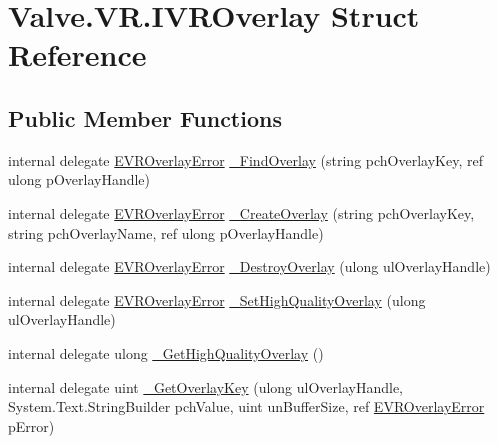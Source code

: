 \hypertarget{struct_valve_1_1_v_r_1_1_i_v_r_overlay}{}\section{Valve.\+V\+R.\+I\+V\+R\+Overlay Struct Reference}
\label{struct_valve_1_1_v_r_1_1_i_v_r_overlay}
\subsection*{Public Member Functions}
\begin{DoxyCompactItemize}
\item 
internal delegate \mbox{\hyperlink{namespace_valve_1_1_v_r_aaee5c5144f42b7969d45b854f51b0c18}{E\+V\+R\+Overlay\+Error}} \mbox{\hyperlink{struct_valve_1_1_v_r_1_1_i_v_r_overlay_a3018bc78389f3d9518de18d91c61f056}{\+\_\+\+Find\+Overlay}} (string pch\+Overlay\+Key, ref ulong p\+Overlay\+Handle)
\item 
internal delegate \mbox{\hyperlink{namespace_valve_1_1_v_r_aaee5c5144f42b7969d45b854f51b0c18}{E\+V\+R\+Overlay\+Error}} \mbox{\hyperlink{struct_valve_1_1_v_r_1_1_i_v_r_overlay_a668f4b8031576ec88d6b713b995592af}{\+\_\+\+Create\+Overlay}} (string pch\+Overlay\+Key, string pch\+Overlay\+Name, ref ulong p\+Overlay\+Handle)
\item 
internal delegate \mbox{\hyperlink{namespace_valve_1_1_v_r_aaee5c5144f42b7969d45b854f51b0c18}{E\+V\+R\+Overlay\+Error}} \mbox{\hyperlink{struct_valve_1_1_v_r_1_1_i_v_r_overlay_a7d6cd1a264d3c052ca478ea34a3606ce}{\+\_\+\+Destroy\+Overlay}} (ulong ul\+Overlay\+Handle)
\item 
internal delegate \mbox{\hyperlink{namespace_valve_1_1_v_r_aaee5c5144f42b7969d45b854f51b0c18}{E\+V\+R\+Overlay\+Error}} \mbox{\hyperlink{struct_valve_1_1_v_r_1_1_i_v_r_overlay_a659761a1e6723ccc46ed137f72a2421e}{\+\_\+\+Set\+High\+Quality\+Overlay}} (ulong ul\+Overlay\+Handle)
\item 
internal delegate ulong \mbox{\hyperlink{struct_valve_1_1_v_r_1_1_i_v_r_overlay_a2e6c4ca94aa9cf9f2735457e985f1994}{\+\_\+\+Get\+High\+Quality\+Overlay}} ()
\item 
internal delegate uint \mbox{\hyperlink{struct_valve_1_1_v_r_1_1_i_v_r_overlay_a38178110dc53cc8ae5a125e70ab89203}{\+\_\+\+Get\+Overlay\+Key}} (ulong ul\+Overlay\+Handle, System.\+Text.\+String\+Builder pch\+Value, uint un\+Buffer\+Size, ref \mbox{\hyperlink{namespace_valve_1_1_v_r_aaee5c5144f42b7969d45b854f51b0c18}{E\+V\+R\+Overlay\+Error}} p\+Error)
\item 

\end{DoxyCompactItemize}
